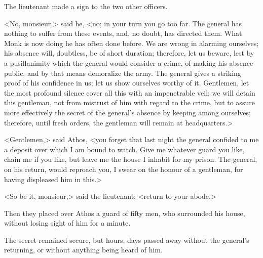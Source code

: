 The lieutenant made a sign to the two other officers.

<No, monsieur,> said he, <no; in your turn you go too far. The general has nothing to suffer from these events, and, no doubt, has directed them. What Monk is now doing he has often done before. We are wrong in alarming ourselves; his absence will, doubtless, be of short duration; therefore, let us beware, lest by a pusillanimity which the general would consider a crime, of making his absence public, and by that means demoralize the army. The general gives a striking proof of his confidence in us; let us show ourselves worthy of it. Gentlemen, let the most profound silence cover all this with an impenetrable veil; we will detain this gentleman, not from mistrust of him with regard to the crime, but to assure more effectively the secret of the general's absence by keeping among ourselves; therefore, until fresh orders, the gentleman will remain at headquarters.>

<Gentlemen,> said Athos, <you forget that last night the general confided to me a deposit over which I am bound to watch. Give me whatever guard you like, chain me if you like, but leave me the house I inhabit for my prison. The general, on his return, would reproach you, I swear on the honour of a gentleman, for having displeased him in this.>

<So be it, monsieur,> said the lieutenant; <return to your abode.>

Then they placed over Athos a guard of fifty men, who surrounded his house, without losing sight of him for a minute.

The secret remained secure, but hours, days passed away without the general's returning, or without anything being heard of him. 